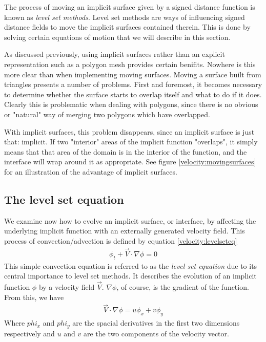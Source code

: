 The process of moving an implicit surface given by a signed distance function is known as \emph{level set methods}. Level set methods are ways of influencing signed distance fields to move the implicit surfaces contained therein. This is done by solving certain equations of motion that we will describe in this section.

As discussed previously, using implicit surfaces rather than an explicit representation such as a polygon mesh provides certain benifits. Nowhere is this more clear than when implementing moving surfaces. Moving a surface built from triangles presents a number of problems. First and foremost, it becomes necessary to determine whether the surface starts to overlap itself and what to do if it does. Clearly this is problematic when dealing with polygons, since there is no obvious or "natural" way of merging two polygons which have overlapped.


With implicit surfaces, this problem disappears, since an implicit surface is just that: implicit. If two "interior" areas of the implicit function "overlaps", it simply means that that area of the domain is in the interior of the function, and the interface will wrap around it as appropriate. See figure \vref{velocity:movingsurfaces} for an illustration of the advantage of implicit surfaces.

\subsection{The level set equation}
We examine now how to evolve an implicit surface, or interface, by affecting the underlying implicit function with an externally generated velocity field. This process of convection/advection is defined by equation \vref{velocity:levelseteq}
\begin{eqnarray}
\label{velocity:levelseteq}
\phi_t + \vec{V}\cdot \nabla \phi = 0
\end{eqnarray}
This simple convection equation is referred to as the \emph{level set equation} due to its central importance to level set methods. It describes the evolution of an implicit function $\phi$ by a velocity field $\vec{V}$. $\nabla \phi$, of course, is the gradient of the function. From this, we have
\begin{eqnarray}
\label{velocity:gradient}
\vec{V}\cdot\nabla\phi = u\phi_x + v\phi_y
\end{eqnarray}
Where $phi_x$ and $phi_y$ are the spacial derivatives in the first two dimensions respectively and $u$ and $v$ are the two components of the velocity vector.

